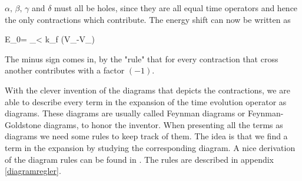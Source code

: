 $\alpha, \, \beta, \, \gamma$ and $\delta$ must all be holes, since they are all equal time operators and hence the only contractions which contribute.
The energy shift can now be written as 

\be
\Delta E_0=	 \sum_{\alpha\beta < k_f} (V_{\alpha\beta\alpha\beta}-V_{\alpha\beta\beta\alpha})
\ee

The minus sign comes in, by the "rule" that for every contraction that cross
another contributes with a factor $(-1).$

With the clever invention of the diagrams that depicts the contractions, we are
able to describe every term in the expansion of the time evolution operator as
diagrams. These diagrams are usually called Feynman diagrams or
Feynman-Goldstone diagrams, to honor the inventor.  When presenting all the
terms as diagrams we need some rules to keep track of them. The idea is that we
find a term in the expansion by studying the corresponding diagram. A nice derivation of the diagram
rules can be found in \cite{kuo1981}.  The rules are described in appendix
\ref{diagramregler}. 




